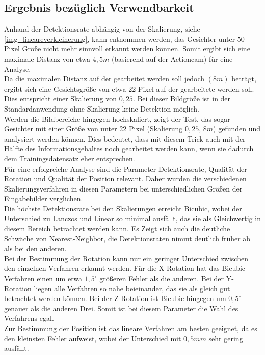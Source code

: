 \subsection{Ergebnis bezüglich Verwendbarkeit}
Anhand der Detektionsrate abhängig von der Skalierung, siehe \autoref{img_lineareverkleinerung}, kann entnommen werden, das Gesichter unter 50 Pixel Größe nicht mehr sinnvoll erkannt werden können. Somit ergibt sich eine maximale Distanz von etwa $4,5m$ (basierend auf der Actioncam) für eine Analyse.\\
Da die maximalen Distanz auf der gearbeitet werden soll jedoch $(8m)$ beträgt, ergibt sich eine Gesichtsgröße von etwa 22 Pixel auf der gearbeitete werden soll. Dies entspricht einer Skalierung von $0,25$. Bei dieser Bildgröße ist in der Standardanwendung ohne Skalierung keine Detektion möglich.\\
Werden die Bildbereiche hingegen hochskaliert, zeigt der Test, das sogar Gesichter mit einer Größe von unter 22 Pixel (Skalierung $0,25$, $8m$) gefunden und analysiert werden können. Dies bedeutet, dass mit diesem Trick auch mit der Hälfte des Informationsgehaltes noch gearbeitet werden kann, wenn sie dadurch dem Trainingsdatensatz eher entsprechen.\\
Für eine erfolgreiche Analyse sind die Parameter Detektionsrate, Qualität der Rotation und Qualität der Position relevant. Daher wurden die verschiedenen Skalierungsverfahren in diesen Parametern bei unterschiedlichen Größen der Eingabebilder verglichen.\\
Die höchste Detektionsrate bei den Skalierungen erreicht Bicubic, wobei der Unterschied zu Lanczos und Linear so minimal ausfällt, das sie als Gleichwertig in diesem Bereich betrachtet werden kann. Es Zeigt sich auch die deutliche Schwäche von Nearest-Neighbor, die Detektionsraten nimmt deutlich früher ab als bei den anderen.\\
Bei der Bestimmung der Rotation kann nur ein geringer Unterschied zwischen den einzelnen Verfahren erkannt werden. Für die X-Rotation hat das Bicubic-Verfahren einen um etwa $1,5^\circ$ größeren Fehler als die anderen. Bei der Y-Rotation liegen alle Verfahren so nahe beieinander, das sie als gleich gut betrachtet werden können. Bei der Z-Rotation ist Bicubic hingegen um $0,5^\circ$ genauer als die anderen Drei. Somit ist bei diesem Parameter die Wahl des Verfahrens egal.\\
Zur Bestimmung der Position ist das lineare Verfahren am besten geeignet, da es den kleinsten Fehler aufweist, wobei der Unterschied mit $0,5mm$ sehr gering ausfällt.\\
